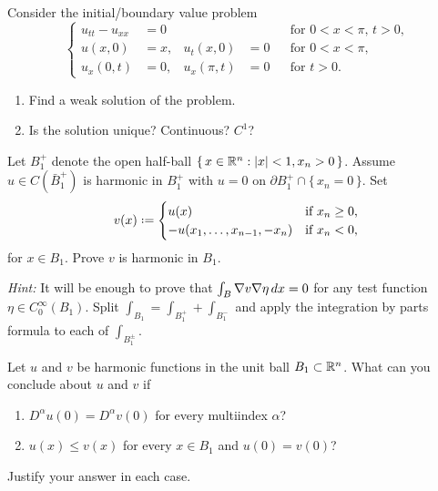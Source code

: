 \begin{problem}
  Consider the initial/boundary value problem
    \[
     \left\{
       \begin{aligned}
         u_{tt}-u_{xx}&=0&&&&\text{for \(0<x<\pi\), \(t>0\),}\\
         u(x,0)&=x,&u_t(x,0)&=0&&\text{for \(0<x<\pi\),}\\
         u_x(0,t)&=0,&u_x(\pi,t)&=0&&\text{for \(t>0\).}
      \end{aligned}
    \right.
  \]
  \begin{enumerate}[label=(\alph*),noitemsep]
  \item Find a weak solution of the problem.
  \item Is the solution unique? Continuous? \(C^1\)?
  \end{enumerate}
\end{problem}
\begin{solution*}
\end{solution*}

\begin{problem}
  Let \(B_1^+\) denote the open half-ball
  \(\{\,x\in\mathbb{R}^n:|x|<1,x_n>0\,\}\). Assume \(u\in C(\bar B_1^+)\) is
  harmonic in \(B_1^+\) with \(u=0\) on \(\partial
  B_1^+\cap\{\,x_n=0\,\}\). Set
  \[
    v(x)\defeq
    \begin{cases}
      u(x)&\text{if \(x_n\geq 0\),}\\
      -u(x_1,\dotsc,x_{n-1},-x_n)&\text{if \(x_n<0\),}
    \end{cases}
  \]
  for \(x\in B_1\). Prove \(v\) is harmonic in \(B_1\).

  \noindent \emph{Hint:} It will be enough to prove that \(\int_B\nabla
  v\nabla\eta\mathop{}\!d x=0\) for any test function \(\eta\in
  C^\infty_0(B_1)\). Split \(\int_{B_1}=\int_{B_1^+}+\int_{B_1^-}\) and
  apply the integration by parts formula to each of \(\int_{B_1^\pm}\).
\end{problem}
\begin{solution*}
\end{solution*}

\begin{problem}
  Let \(u\) and \(v\) be harmonic functions in the unit ball
  \(B_1\subset\mathbb{R}^n\). What can you conclude about \(u\) and \(v\) if
  \begin{enumerate}[label=(\alph*),noitemsep]
  \item \(D^\alpha u(0)=D^\alpha v(0)\) for every multiindex \(\alpha\)?
  \item \(u(x)\leq v(x)\) for every \(x\in B_1\) and \(u(0)=v(0)\)?
  \end{enumerate}
  Justify your answer in each case.
\end{problem}
\begin{solution*}
\end{solution*}

